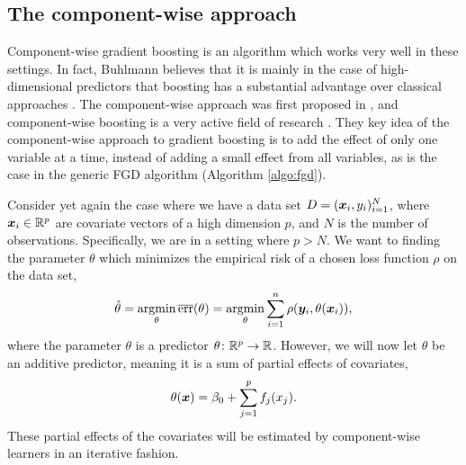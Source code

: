 \subsection{The component-wise approach}
Component-wise gradient boosting is an algorithm which works very well in these settings.
In fact, Buhlmann believes that it is mainly in the case of high-dimensional predictors that boosting has a substantial advantage over classical approaches \citep{buhlmann2006}.
The component-wise approach was first proposed in \citep{buhlmann-yu}, and component-wise boosting is a very active field of research \citep{buhlmann2006, mayr14a, mayr14b, mayr17}.
They key idea of the component-wise approach to gradient boosting is to add the effect of only one variable at a time, instead of adding a small effect from all variables, as is the case in the generic FGD algorithm (Algorithm \ref{algo:fgd}).

Consider yet again the case where we have a data set $D=(\bm{x}_i,y_i)_{i=1}^N$, where $\bm{x}_i\in\mathbb{R}^p$ are covariate vectors of a high dimension $p$, and $N$ is the number of observations.
Specifically, we are in a setting where $p>N$.
We want to finding the parameter $\theta$ which minimizes the empirical risk of a chosen loss function $\rho$ on the data set,
\begin{equation*}
    \hat{\theta}=\operatorname*{argmin}_{\theta}\overline{\text{err}}(\theta)=\operatorname*{argmin}_{\theta}\sum_{i=1}^n\rho(\bm{y}_i,\theta(\bm{x}_i)),
\end{equation*}
where the parameter $\theta$ is a predictor $\theta\colon\mathbb{R}^p\to\mathbb{R}$.
However, we will now let $\theta$ be an additive predictor, meaning it is a sum of partial effects of covariates,
\begin{equation*}
    \theta(\bm{x})=\beta_0+\sum_{j=1}^p f_j(x_j).
\end{equation*}
These partial effects of the covariates will be estimated by component-wise learners in an iterative fashion.

